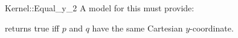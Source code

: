 \begin{ccRefFunctionObjectConcept}{Kernel::Equal_y_2}
A model for this must provide:


{returns true iff $p$ and $q$ have the same Cartesian $y$-coordinate.}

\end{ccRefFunctionObjectConcept}

